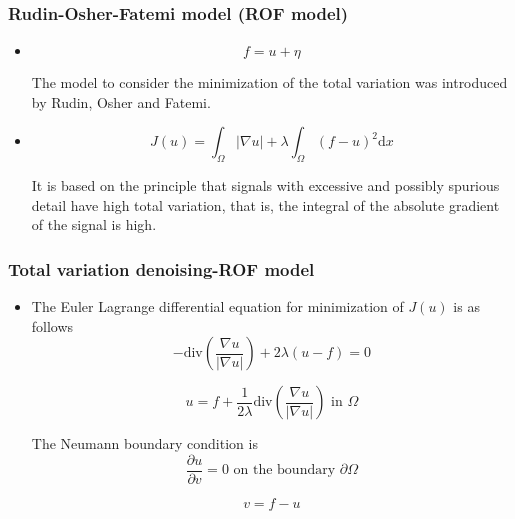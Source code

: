 \documentclass[notheorems,mathserif,table,compress]{beamer}  %
\begin{document}
%
\begin{frame}
\frametitle{Rudin-Osher-Fatemi model (ROF model)}
\begin{itemize}
\item 
\begin{displaymath}
f=u+\eta
\end{displaymath}

The model to consider the minimization of the total variation was introduced by Rudin, Osher and Fatemi.
\item \newcommand{\ud}{\mathrm{d}}
\begin{displaymath}
J(u)=\int_{\Omega}|\nabla u|+\lambda \int_{\Omega}(f-u)^2\ud x
\end{displaymath}

It is based on the principle that signals with excessive and possibly spurious detail have high total variation, that is, the integral of the absolute gradient of the signal is high.
\end{itemize}

\end{frame}

%
\begin{frame}
\frametitle{Total variation denoising-ROF model}
\begin{itemize}
\item The Euler Lagrange differential equation for minimization of $J(u)$ is as follows
\begin{displaymath}
-\textrm{div}(\frac{\nabla u}{|\nabla u|})+2\lambda(u-f)=0
\end{displaymath}

\begin{displaymath}
u=f+\frac{1}{2\lambda}\textrm{div}(\frac{\nabla u}{|\nabla u|}) \textrm{ in $\Omega$} 
\end{displaymath}

The Neumann boundary condition is
\begin{displaymath}
\frac{\partial u}{\partial v}=0 \textrm{ on the boundary $\partial{\Omega}$}
\end{displaymath}

\begin{displaymath}
v=f-u
\end{displaymath}
\end{itemize}
\end{frame}
\end{document}
